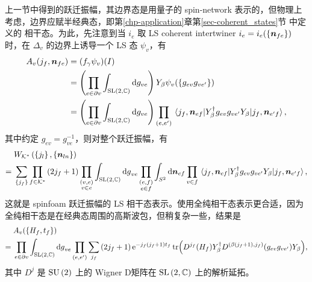 			上一节中得到的跃迁振幅，其边界态是用量子的 spin-network 表示的，但物理上考虑，边界应赋半经典态，即第\ref{chp-application}章第\ref{sec-coherent_states}节 中定义的 相干态。为此，先注意到当 $i_e$ 取 LS coherent intertwiner $i_e=i_e(\{\vb*{n}_{fe}\})$ 时，在 $\Delta_v$ 的边界上诱导一个 LS 态 $\psi_v$，有
			\begin{equation}
				\begin{split}
					A_v(j_f,\vb*{n}_{fe}) &= (f_\gamma \psi_v)(I)\\
					&= \left( \prod_{e\in \partial v} \int_{\mathrm{SL}\left( 2,\mathbb{C} \right)} \dd{g_{ve}} \right) Y_\beta \psi_v(\{g_{ev} g_{ve'}\})\\
					&= \left( \prod_{e\in \partial v} \int_{\mathrm{SL}\left( 2,\mathbb{C} \right)} \dd{g_{ve}} \right) \prod_{(e,e')} \mel{j_f,\vb*{n}_{ef}}{Y_\beta^\dagger g_{ev} g_{ve'} Y_\beta}{j_f,\vb*{n}_{e'f}},
				\end{split}
			\end{equation}
			其中约定 $g_{ev} = g_{ve}^{-1}$，则对整个跃迁振幅，有
			\begin{equation}
				\begin{split}
					&W_{\mathcal{K}^*}\left(\left\{ j_l\right\},\left\{ \vb*{n}_{ln} \right\}\right)\\
					={}& \sum_{\left\{ j_f \right\}} \prod_{f\in \mathcal{K}^*} \left( 2j_f + 1 \right) \prod_{\substack{(v,e)\\v\in e}} \int_{\mathrm{SL}\left( 2,\mathbb{C} \right)} \dd{g}_{ve} \prod_{\substack{(e,f)\\e\in f}} \int_{S^2} \dd{\vb*{n}_{ef}} \prod_{v\in f} \mel{j_f,\vb*{n}_{ef}}{Y_\beta^\dagger g_{ev} g_{ve'} Y_\beta}{j_f,\vb*{n}_{e'f}},
				\end{split}
			\end{equation}
			这就是 spinfoam 跃迁振幅的 LS 相干态表示。使用全纯相干态表示更合适，因为全纯相干态是在经典态周围的高斯波包，但稍复杂一些，结果是\cite{Bianchi2010}
			\begin{equation}
				\begin{split}
					&A_v(\{H_f,t_f\})\\
					={}& \prod_{e\in \partial v} \int_{\mathrm{SL}\left( 2,\mathbb{C} \right)} \dd{g}_{ve} \prod_{(e,e')} \sum_{j_f} \left( 2 j_f + 1 \right) \mathrm{e}^{-j_f(j_f+1) t_f} \tr(D^{j_f}(H_f) Y_\beta^\dagger D^{(\beta (j_f+1),j_f)}(g_{ev}g_{ve'}) Y_\beta),
				\end{split}
			\end{equation}
			其中 $D^{j}$ 是 $\mathrm{SU}\left(2\right)$ 上的 Wigner D矩阵在 $\mathrm{SL}\left( 2,\mathbb{C} \right)$ 上的解析延拓。

